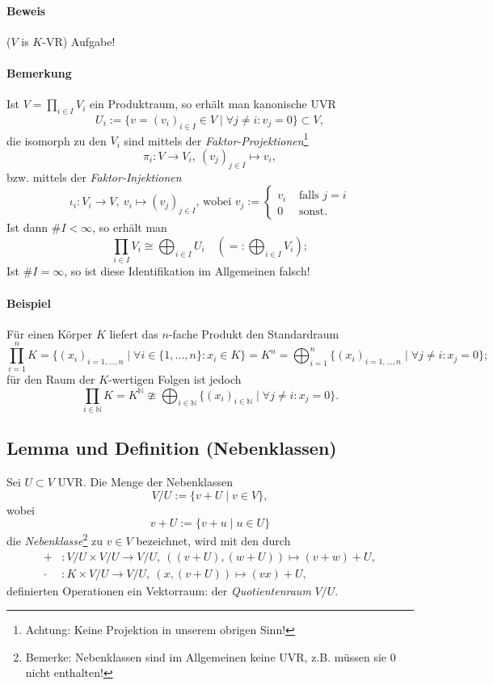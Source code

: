 \paragraph{Beweis} ($V$ is $K$-VR) Aufgabe!

\paragraph{Bemerkung} 
	Ist $V = \prod_{i\in I} V_i$ ein Produktraum, so erhält man kanonische UVR
		\[U_i:=\{v=(v_i)_{i\in I}\in V\mid\forall j \neq i:v_j = 0\}\subset V,\]
	die isomorph zu den $V_i$ sind mittels der \emph{Faktor-Projektionen}\footnote{Achtung: Keine Projektion in unserem obrigen Sinn!}
		\[\pi_i:V\to V_i,\ (v_j)_{j\in I} \mapsto v_i,\]
	bzw. mittels der \emph{Faktor-Injektionen}
		\[\iota_i:V_i\to V,\ v_i \mapsto(v_j)_{j\in I}\text{, wobei }v_j :=
			\begin{cases}
				v_i &\text{ falls } j=i\\
				0 &\text{ sonst.}
			\end{cases}
		\]
	Ist dann $\# I < \infty$, so erhält man
		\[\prod_{i\in I} V_i\cong \bigoplus_{i\in I}U_i\quad (=: \bigoplus_{i\in I}V_i);\]
	Ist $\#I=\infty$, so ist diese Identifikation im Allgemeinen falsch!
	
\paragraph{Beispiel}
	Für einen Körper $ K $ liefert das $ n $-fache Produkt den Standardraum
		\[\prod_{i=1}^{n}K = \{(x_i)_{i = 1,...,n}\mid\forall i \in \{1,...,n\}: x_i \in K\} = K^n = \bigoplus_{i=1}^n\{(x_i)_{i = 1,...,n}\mid\forall j\neq i: x_j = 0\};\]
	für den Raum der $K$-wertigen Folgen ist jedoch
		\[\prod_{i\in \mathbb{N}}K=K^{\mathbb{N}}\ncong\bigoplus_{i\in \mathbb{N}}\{(x_i)_{i\in \mathbb{N}}\mid\forall j\neq i: x_j=0\}.\]
			
\subsection{Lemma und Definition (Nebenklassen)}
	\begin{Definition}[Nebenklassen]
		Sei $U\subset V$ UVR. Die Menge der Nebenklassen 
		\[V/U := \{v+U\mid v\in V\},\]
	wobei
		\[v+U:=\{v+u\mid u\in U\}\]
	die \emph{Nebenklasse}\footnote{Bemerke: Nebenklassen sind im Allgemeinen keine UVR, z.B. müssen sie $0$ nicht enthalten!} zu $v\in V$ bezeichnet, wird mit den durch
		\begin{align*}
			+&: V/U \times V/U \to V/U,\ ((v+U),(w+U))\mapsto (v+w)+U,\\
			\cdot &: K\times V/U \to V/U,\ (x,(v+U))\mapsto (vx)+U,
		\end{align*}
	definierten Operationen ein Vektorraum: der \emph{Quotientenraum} $V/U$.
	\end{Definition}
			
